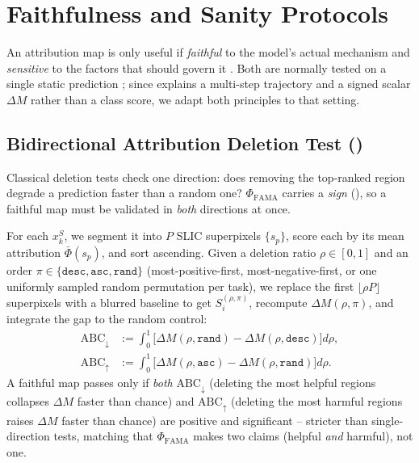 \section{Faithfulness and Sanity Protocols}
\label{sec:protocols}

An attribution map is only useful if \emph{faithful} to the model's actual mechanism and \emph{sensitive} to the factors that should govern it \citep{eu2019trustworthy}. Both are normally tested on a single static prediction \citep{samek2016evaluating,petsiuk2018rise,adebayo2018sanity}; since \fama explains a multi-step trajectory and a signed scalar $\Delta M$ rather than a class score, we adapt both principles to that setting.

\subsection{Bidirectional Attribution Deletion Test (\biadt)}
\label{sec:biadt}

Classical deletion tests \citep{samek2016evaluating,petsiuk2018rise} check one direction: does removing the top-ranked region degrade a prediction faster than a random one? $\Phi_{\mathrm{FAMA}}$ carries a \emph{sign} (), so a faithful map must be validated in \emph{both} directions at once.

For each $x_k^S$, we segment it into $P$ SLIC superpixels \citep{achanta2012slic} $\{s_p\}$, score each by its mean attribution $\bar\Phi(s_p)$, and sort ascending. Given a deletion ratio $\rho\in[0,1]$ and an order $\pi\in\{\texttt{desc},\texttt{asc},\texttt{rand}\}$ (most-positive-first, most-negative-first, or one uniformly sampled random permutation per task), we replace the first $\lfloor\rho P\rfloor$ superpixels with a blurred baseline to get $S_i^{(\rho,\pi)}$, recompute $\Delta M(\rho,\pi)$, and integrate the gap to the random control:
\begin{equation}
\begin{split}
    \mathrm{ABC}_{\downarrow} &:= \textstyle\int_0^1\!\big[\Delta M(\rho,\texttt{rand}){-}\Delta M(\rho,\texttt{desc})\big]d\rho,\\
    \mathrm{ABC}_{\uparrow} &:= \textstyle\int_0^1\!\big[\Delta M(\rho,\texttt{asc}){-}\Delta M(\rho,\texttt{rand})\big]d\rho.
\end{split}
\label{eq:abc_metric}
\end{equation}
A faithful map passes \biadt only if \emph{both} $\mathrm{ABC}_\downarrow$ (deleting the most helpful regions collapses $\Delta M$ faster than chance) and $\mathrm{ABC}_\uparrow$ (deleting the most harmful regions raises $\Delta M$ faster than chance) are positive and significant -- stricter than single-direction tests, matching that $\Phi_{\mathrm{FAMA}}$ makes two claims (helpful \emph{and} harmful), not one.

